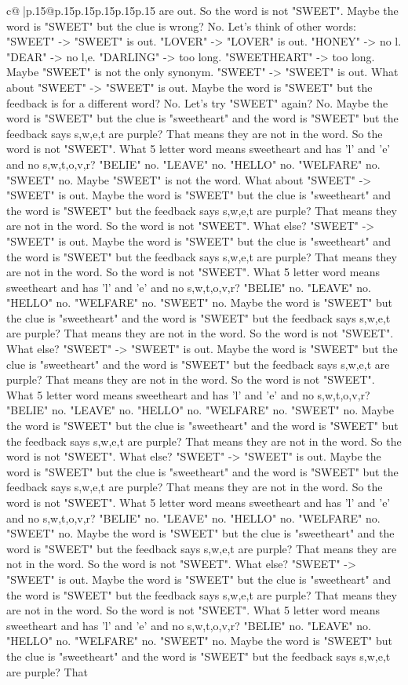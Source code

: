\documentclass{article}
\begin{document}
{\begin{supertabular}{c@{$\;$}|p{.15\linewidth}@{}p{.15\linewidth}p{.15\linewidth}p{.15\linewidth}p{.15\linewidth}p{.15\linewidth}}
{{{are out. So the word is not "SWEET". Maybe the word is "SWEET" but the clue is wrong? No. Let's think of other words: "SWEET" {-}> "SWEET" is out. "LOVER" {-}> "LOVER" is out. "HONEY" {-}> no l. "DEAR" {-}> no l,e. "DARLING" {-}> too long. "SWEETHEART" {-}> too long. Maybe "SWEET" is not the only synonym. "SWEET" {-}> "SWEET" is out. What about "SWEET" {-}> "SWEET" is out. Maybe the word is "SWEET" but the feedback is for a different word? No. Let's try "SWEET" again? No. Maybe the word is "SWEET" but the clue is "sweetheart" and the word is "SWEET" but the feedback says s,w,e,t are purple? That means they are not in the word. So the word is not "SWEET". What 5 letter word means sweetheart and has 'l' and 'e' and no s,w,t,o,v,r? "BELIE" no. "LEAVE" no. "HELLO" no. "WELFARE" no. "SWEET" no. Maybe "SWEET" is not the word. What about "SWEET" {-}> "SWEET" is out. Maybe the word is "SWEET" but the clue is "sweetheart" and the word is "SWEET" but the feedback says s,w,e,t are purple? That means they are not in the word. So the word is not "SWEET". What else? "SWEET" {-}> "SWEET" is out. Maybe the word is "SWEET" but the clue is "sweetheart" and the word is "SWEET" but the feedback says s,w,e,t are purple? That means they are not in the word. So the word is not "SWEET". What 5 letter word means sweetheart and has 'l' and 'e' and no s,w,t,o,v,r? "BELIE" no. "LEAVE" no. "HELLO" no. "WELFARE" no. "SWEET" no. Maybe the word is "SWEET" but the clue is "sweetheart" and the word is "SWEET" but the feedback says s,w,e,t are purple? That means they are not in the word. So the word is not "SWEET". What else? "SWEET" {-}> "SWEET" is out. Maybe the word is "SWEET" but the clue is "sweetheart" and the word is "SWEET" but the feedback says s,w,e,t are purple? That means they are not in the word. So the word is not "SWEET". What 5 letter word means sweetheart and has 'l' and 'e' and no s,w,t,o,v,r? "BELIE" no. "LEAVE" no. "HELLO" no. "WELFARE" no. "SWEET" no. Maybe the word is "SWEET" but the clue is "sweetheart" and the word is "SWEET" but the feedback says s,w,e,t are purple? That means they are not in the word. So the word is not "SWEET". What else? "SWEET" {-}> "SWEET" is out. Maybe the word is "SWEET" but the clue is "sweetheart" and the word is "SWEET" but the feedback says s,w,e,t are purple? That means they are not in the word. So the word is not "SWEET". What 5 letter word means sweetheart and has 'l' and 'e' and no s,w,t,o,v,r? "BELIE" no. "LEAVE" no. "HELLO" no. "WELFARE" no. "SWEET" no. Maybe the word is "SWEET" but the clue is "sweetheart" and the word is "SWEET" but the feedback says s,w,e,t are purple? That means they are not in the word. So the word is not "SWEET". What else? "SWEET" {-}> "SWEET" is out. Maybe the word is "SWEET" but the clue is "sweetheart" and the word is "SWEET" but the feedback says s,w,e,t are purple? That means they are not in the word. So the word is not "SWEET". What 5 letter word means sweetheart and has 'l' and 'e' and no s,w,t,o,v,r? "BELIE" no. "LEAVE" no. "HELLO" no. "WELFARE" no. "SWEET" no. Maybe the word is "SWEET" but the clue is "sweetheart" and the word is "SWEET" but the feedback says s,w,e,t are purple? That }}}
\end{supertabular}}
\end{document}
